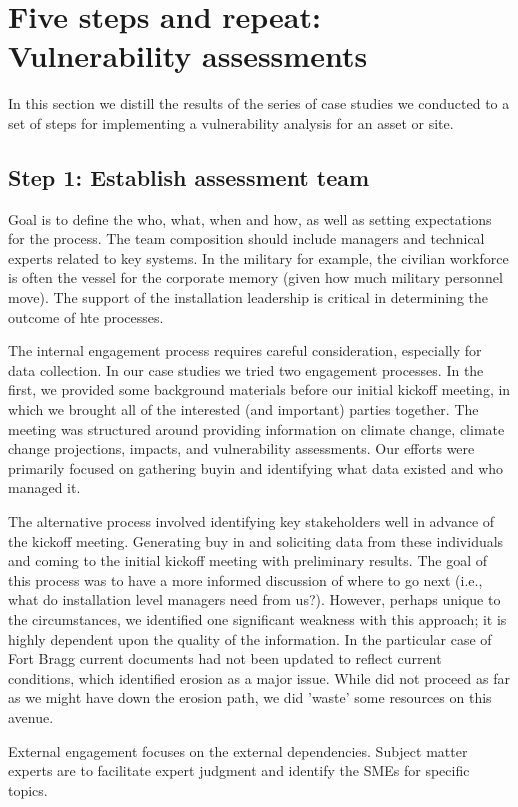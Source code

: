\documentclass[10pt]{amsart}
\begin{document}
\section{Five steps and repeat: Vulnerability assessments}
In this section we distill the results of the series of case studies we conducted to a set of steps for implementing a vulnerability analysis for an asset or site. 

\subsection{Step 1: Establish assessment team}
Goal is to define the who, what, when and how, as well as setting expectations for the process.
The team composition should include managers and technical experts related to key systems.
In the military for example, the civilian workforce is often the vessel for the corporate memory (given how much military personnel move).
The support of the installation leadership is critical in determining the outcome of hte processes. 

The internal engagement process requires careful consideration, especially for data collection.
In our case studies we tried two engagement processes.
In the first, we provided some background materials before our initial kickoff meeting, in which we brought all of the interested (and important) parties together.
The meeting was structured around providing information on climate change, climate change projections, impacts, and vulnerability assessments.
Our efforts were primarily focused on gathering buyin and identifying what data existed and who managed it. 

The alternative process involved identifying key stakeholders well in advance of the kickoff meeting.
Generating buy in and soliciting data from these individuals and coming to the initial kickoff meeting with preliminary results.
The goal of this process was to have a more informed discussion of where to go next (i.e., what do installation level managers need from us?).
However, perhaps unique to the circumstances, we identified one significant weakness with this approach; it is highly dependent upon the quality of the information.
In the particular case of Fort Bragg current documents had not been updated to reflect current conditions, which identified erosion as a major issue. 
While did not proceed as far as we might have down the erosion path, we did 'waste' some resources on this avenue.

External engagement focuses on the external dependencies.
Subject matter experts are to facilitate expert judgment and identify the SMEs for specific topics.
\end{document}
